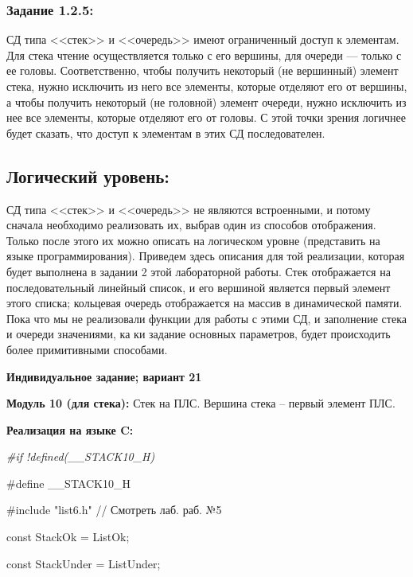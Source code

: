 \documentclass[12pt]{article}
\begin{document}
{	\subsubsection{Задание 1.2.5:}
	\label{task_1_2_5}
	СД типа <<стек>> и <<очередь>> имеют ограниченный доступ к элементам. Для стека чтение осуществляется только с его вершины, для очереди --- только с ее головы. Соответственно, чтобы получить некоторый (не вершинный) элемент стека, нужно исключить из него все элементы, которые отделяют его от вершины, а чтобы получить некоторый (не головной) элемент очереди, нужно исключить из нее все элементы, которые отделяют его от головы. С этой точки зрения логичнее будет сказать, что доступ к элементам в этих СД последователен.
	
	\subsection{Логический уровень:}
	\label{task_1_3}
	СД типа <<стек>> и <<очередь>> не являются встроенными, и потому сначала необходимо реализовать их, выбрав один из способов отображения. Только после этого их можно описать на логическом уровне (представить на языке программирования). Приведем здесь описания для той реализации, которая будет выполнена в задании 2 этой лабораторной работы. Стек отображается на последовательный линейный список, и его вершиной является первый элемент этого списка; кольцевая очередь отображается на массив в динамической памяти. Пока что мы не реализовали функции для работы с этими СД, и заполнение стека и очереди значениями, ка ки задание основных параметров, будет происходить более примитивными способами.
	
	 
		
	 
	
	\begin{center}
	{\bf Индивидуальное задание; вариант 21}
	\end{center}
	{\bf Модуль 10 (для стека):} Стек на ПЛС. Вершина стека – первый элемент ПЛС.
	
	{\bf Реализация на языке C:}
	
	{\it \#if !defined(\_\_STACK10\_H)
		
		\#define \_\_STACK10\_H
		
		\#include "list6.h" // Смотреть лаб. раб. №5
		
		const StackOk = ListOk;
		
		const StackUnder = ListUnder;
		
}}
\end{document}
